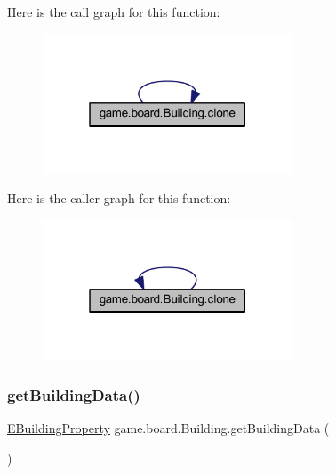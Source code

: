 Here is the call graph for this function\+:
\nopagebreak
\begin{figure}[H]
\begin{center}
\leavevmode
\includegraphics[width=211pt]{classgame_1_1board_1_1_building_a16638e9e0998a6e18c5beba410cfdf66_cgraph}
\end{center}
\end{figure}
Here is the caller graph for this function\+:
\nopagebreak
\begin{figure}[H]
\begin{center}
\leavevmode
\includegraphics[width=211pt]{classgame_1_1board_1_1_building_a16638e9e0998a6e18c5beba410cfdf66_icgraph}
\end{center}
\end{figure}
\mbox{\label{classgame_1_1board_1_1_building_a270e3f351d616701d68b776b054a1b63}} 
\subsubsection{\texorpdfstring{get\+Building\+Data()}{getBuildingData()}}
{\footnotesize\ttfamily \mbox{\hyperlink{enumrule_engine_1_1entity_1_1_e_building_property}{E\+Building\+Property}} game.\+board.\+Building.\+get\+Building\+Data (\begin{DoxyParamCaption}{ }\end{DoxyParamCaption})\hspace{0.3cm}{\ttfamily [inline]}}

